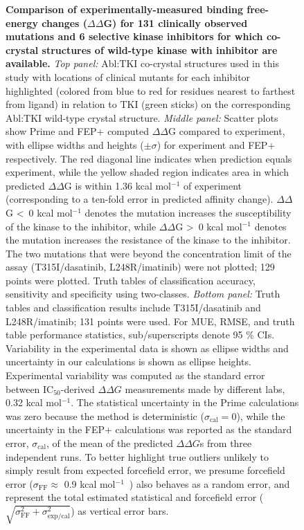 \documentclass[phd,tocprelim]{cornell}
\begin{document}
\begin{landscape}
	\begin{figure}
		\caption[Figure caption]{{\bf Comparison of experimentally-measured binding free-energy changes ($\Delta \Delta$G) for 131 clinically observed mutations and 6 selective kinase inhibitors for which co-crystal structures of wild-type kinase with inhibitor are available.}
			\emph{Top panel:} Abl:TKI co-crystal structures used in this study with locations of clinical mutants for each inhibitor highlighted (colored from blue to red for residues nearest to farthest from ligand) in relation to TKI (green sticks) on the corresponding Abl:TKI wild-type crystal structure.
			\emph{Middle panel:} Scatter plots show Prime and FEP+ computed $\Delta \Delta $G compared to experiment, with ellipse widths and heights ($\pm\sigma$) for experiment and FEP+ respectively.
			The red diagonal line indicates when prediction equals experiment, while the yellow shaded region indicates area in which predicted $\Delta \Delta$G is within 1.36 kcal mol$^{-1}$ of experiment (corresponding to a ten-fold error in predicted affinity change).
			$\Delta \Delta$G \textless~0 kcal mol$^{-1}$ denotes the mutation increases the susceptibility of the kinase to the inhibitor, while $\Delta \Delta$G \textgreater~0 kcal mol$^{-1}$ denotes the mutation increases the resistance of the kinase to the inhibitor.
			The two mutations that were beyond the concentration limit of the assay (T315I/dasatinib, L248R/imatinib) were not plotted; 129 points were plotted.
			Truth tables of classification accuracy, sensitivity and specificity using two-classes. 
			\emph{Bottom panel:} Truth tables and classification results include T315I/dasatinib and L248R/imatinib; 131 points were used.
			For MUE, RMSE, and truth table performance statistics, sub/superscripts denote 95 \% CIs. 
			Variability in the experimental data is shown as ellipse widths and uncertainty in our calculations is shown as ellipse heights. 
			Experimental variability was computed as the standard error between IC$_{50}$-derived $\Delta \Delta G$ measurements made by different labs, 0.32 kcal mol$^{-1}$. 
			The statistical uncertainty in the Prime calculations was zero because the method is deterministic ($\sigma_\mathrm{cal}=0$), while the uncertainty in the FEP+ calculations was reported as the standard error, $\sigma_\mathrm{cal}$, of the mean of the predicted $\Delta \Delta G$s from three independent runs. 
			To better highlight true outliers unlikely to simply result from expected forcefield error, we presume forcefield error ($\sigma_\mathrm{FF} \approx$ 0.9 kcal mol$^{-1}$~\cite{Harder:J.Chem.TheoryComput.:2016}) also behaves as a random error, and represent the total estimated statistical and forcefield error ($\sqrt{\sigma_\mathrm{FF}^2 + \sigma_\mathrm{exp/cal}^2}$) as vertical error bars. 
}
\end{figure}
\end{landscape}
\end{document}
